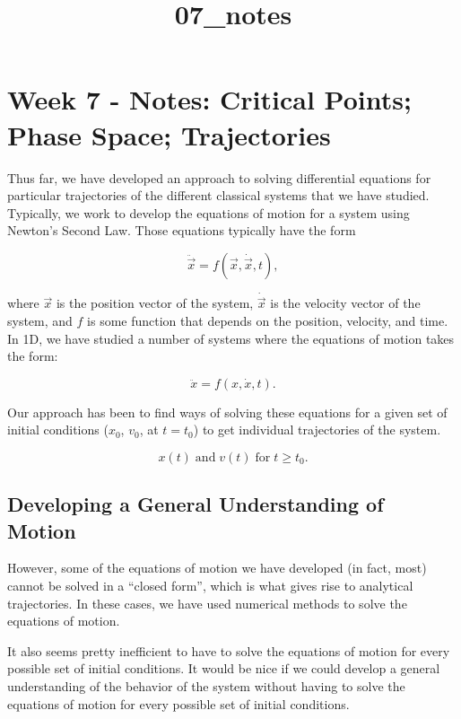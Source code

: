 \documentclass[11pt]{article}
\title{07\_notes}
\begin{document}
    
    \maketitle
    
    

    
    \section{Week 7 - Notes: Critical Points; Phase Space;
Trajectories}\label{week-7---notes-critical-points-phase-space-trajectories}

Thus far, we have developed an approach to solving differential
equations for particular trajectories of the different classical systems
that we have studied. Typically, we work to develop the equations of
motion for a system using Newton's Second Law. Those equations typically
have the form

\[\ddot{\vec{x}} = f(\vec{x}, \dot{\vec{x}}, t),\]

where \(\vec{x}\) is the position vector of the system,
\(\dot{\vec{x}}\) is the velocity vector of the system, and \(f\) is
some function that depends on the position, velocity, and time. In 1D,
we have studied a number of systems where the equations of motion takes
the form:

\[\ddot{x} = f(x, \dot{x}, t).\]

Our approach has been to find ways of solving these equations for a
given set of initial conditions (\(x_0\), \(v_0\), at \(t=t_0\)) to get
individual trajectories of the system.

\[x(t)\; \text{and}\; v(t)\; \text{for}\; t \geq t_0.\]

\subsection{Developing a General Understanding of
Motion}\label{developing-a-general-understanding-of-motion}

However, some of the equations of motion we have developed (in fact,
most) cannot be solved in a ``closed form'', which is what gives rise to
analytical trajectories. In these cases, we have used numerical methods
to solve the equations of motion.

It also seems pretty inefficient to have to solve the equations of
motion for every possible set of initial conditions. It would be nice if
we could develop a general understanding of the behavior of the system
without having to solve the equations of motion for every possible set
of initial conditions.
\end{document}

